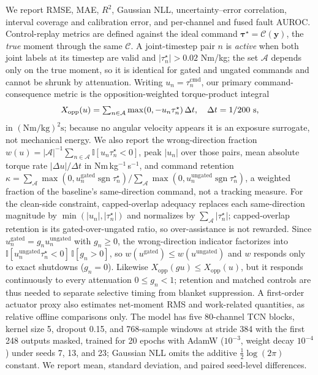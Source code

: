 \documentclass[letterpaper]{article} %
\begin{document}
We report RMSE, MAE, $R^2$, Gaussian NLL, uncertainty--error correlation, interval coverage and calibration error, and per-channel and fused fault AUROC. Control-replay metrics are defined against the ideal command $\boldsymbol{\tau}^{\star}=\mathcal{C}(\mathbf{y})$, the \emph{true} moment through the same $\mathcal{C}$.
A joint-timestep pair $n$ is \emph{active} when both joint labels at its timestep are valid and $|\tau^{\star}_n|>0.02$ Nm/kg; the set $\mathcal{A}$ depends only on the true moment, so it is identical for gated and ungated commands and cannot be shrunk by attenuation.
Writing $u_n=\tau^{\mathrm{cmd}}_n$, our primary command-consequence metric is the opposition-weighted torque-product integral
\begin{equation}
X_{\mathrm{opp}}(u)=\textstyle\sum_{n\in\mathcal{A}}
\max(0,-u_n\tau^{\star}_n)\,\Delta t,\quad \Delta t=1/200\ {\rm s},
\end{equation}
in $(\mathrm{Nm/kg})^2\mathrm{s}$; because no angular velocity appears it is an exposure surrogate, not mechanical energy.
We also report the wrong-direction fraction
$w(u)=|\mathcal{A}|^{-1}\sum_{n\in\mathcal{A}}\mathbb{I}[u_n\tau_n^\star<0]$, peak $|u_n|$ over those pairs, mean absolute torque rate $|\Delta u|/\Delta t$ in Nm\,kg$^{-1}$\,s$^{-1}$, and command retention $\kappa=\sum_{\mathcal{A}}\max(0,u_n^{\mathrm{gated}}\operatorname{sgn}\tau_n^\star)/\sum_{\mathcal{A}}\max(0,u_n^{\mathrm{ungated}}\operatorname{sgn}\tau_n^\star)$, a weighted fraction of the baseline's same-direction command, not a tracking measure.
For the clean-side constraint, capped-overlap adequacy replaces each same-direction magnitude by $\min(|u_n|,|\tau_n^\star|)$ and normalizes by $\sum_{\mathcal A}|\tau_n^\star|$; capped-overlap retention is its gated-over-ungated ratio, so over-assistance is not rewarded.
Since $u_n^{\mathrm{gated}}=g_nu_n^{\mathrm{ungated}}$ with $g_n\geq0$, the wrong-direction indicator factorizes into $\mathbb{I}[u_n^{\mathrm{ungated}}\tau_n^\star<0]\,\mathbb{I}[g_n>0]$, so $w(u^{\mathrm{gated}})\leq w(u^{\mathrm{ungated}})$ and $w$ responds only to exact shutdowns ($g_n=0$). Likewise $X_{\mathrm{opp}}(gu)\leq X_{\mathrm{opp}}(u)$, but it responds continuously to every attenuation $0\leq g_n<1$; retention and matched controls are thus needed to separate selective timing from blanket suppression.
A first-order actuator proxy also estimates net-moment RMS and work-related quantities, as relative offline comparisons only.
The model has five 80-channel TCN blocks, kernel size 5, dropout 0.15, and 768-sample windows at stride 384 with the first 248 outputs masked, trained for 20 epochs with AdamW ($10^{-3}$, weight decay $10^{-4}$) under seeds 7, 13, and 23; Gaussian NLL omits the additive $\frac12\log(2\pi)$ constant. We report mean, standard deviation, and paired seed-level differences.
\end{document}
